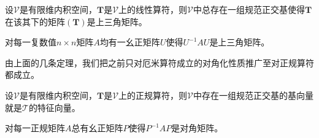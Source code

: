 \documentclass[main.tex]{subfiles}
\begin{document}
\begin{theorem}
设$\mathcal{V}$是有限维内积空间，$\mathbf{T}$是$\mathcal{V}$上的线性算符，则$\mathcal{V}$中总存在一组规范正交基使得$\mathbf{T}$在该其下的矩阵$\left(\mathbf{T}\right)$是上三角矩阵。
\end{theorem}

\begin{corollary}
对每一复数值$n\times n$矩阵$A$均有一幺正矩阵$U$使得$U^{-1}AU$是上三角矩阵。
\end{corollary}

由上面的几条定理，我们把之前只对厄米算符成立的对角化性质推广至对正规算符都成立。

\begin{theorem}
设$\mathcal{V}$是有限维内积空间，$\mathbf{T}$是$\mathcal{V}$上的正规算符，则$\mathcal{V}$中存在一组规范正交基的基向量就是$\mathcal{T}$的特征向量。
\end{theorem}

\begin{corollary}
对每一正规矩阵$A$总有幺正矩阵$P$使得$P^{-1}AP$是对角矩阵。
\end{corollary}
\end{document}
